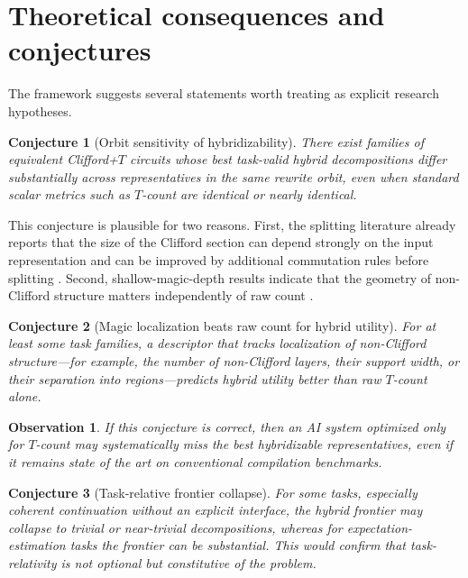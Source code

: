 \documentclass[11pt]{article}
\newtheorem{observation}{Observation}
\newtheorem{conjecture}{Conjecture}
\theoremstyle{remark}
\begin{document}
\section{Theoretical consequences and conjectures}

The framework suggests several statements worth treating as explicit research hypotheses.

\begin{conjecture}[Orbit sensitivity of hybridizability]
There exist families of equivalent Clifford+$T$ circuits whose best task-valid hybrid decompositions differ substantially across representatives in the same rewrite orbit, even when standard scalar metrics such as $T$-count are identical or nearly identical.
\end{conjecture}

This conjecture is plausible for two reasons. First, the splitting literature already reports that the size of the Clifford section can depend strongly on the input representation and can be improved by additional commutation rules before splitting \cite{splitting_2025}. Second, shallow-magic-depth results indicate that the geometry of non-Clifford structure matters independently of raw count \cite{shallow_magic_2025}.

\begin{conjecture}[Magic localization beats raw count for hybrid utility]
For at least some task families, a descriptor that tracks localization of non-Clifford structure---for example, the number of non-Clifford layers, their support width, or their separation into regions---predicts hybrid utility better than raw $T$-count alone.
\end{conjecture}

\begin{observation}
If this conjecture is correct, then an AI system optimized only for $T$-count may systematically miss the best hybridizable representatives, even if it remains state of the art on conventional compilation benchmarks.
\end{observation}

\begin{conjecture}[Task-relative frontier collapse]
For some tasks, especially coherent continuation without an explicit interface, the hybrid frontier may collapse to trivial or near-trivial decompositions, whereas for expectation-estimation tasks the frontier can be substantial. This would confirm that task-relativity is not optional but constitutive of the problem.
\end{conjecture}
\end{document}
